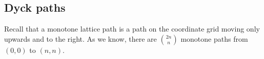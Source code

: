 

\setcounter{section}{4}
\setcounter{subsection}{5}
\setcounter{dfn}{6}

\subsection{Dyck paths}
Recall that a monotone lattice path is a path on the coordinate grid moving only upwards and to the right.
As we know, there are $\binom{2n}{n}$ monotone paths from $(0,0)$ to $(n,n)$.


